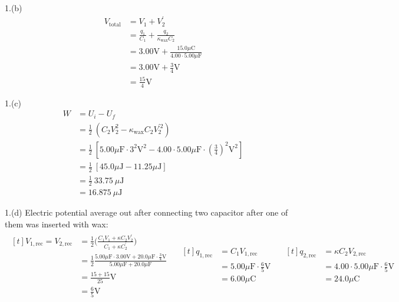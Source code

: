 \documentclass[11pt]{article}
\begin{document}
1.(b)
\begin{align*}
V_{\mathrm{total}} &= V_1 + V^{'}_2 \\
          &= \frac{q_1}{C_1} + \frac{q_2}{\kappa_{\mathrm{wax}} C_2} \\
          &= 3.00 \mathrm{V} + \frac{15.0 \mu \mathrm{C}}{4.00 \cdot 5.00 \mu \mathrm{F}} \\
          &= 3.00 \mathrm{V} + \frac{3}{4} \mathrm{V} \\
          &= \frac{15}{4} \mathrm{V}
\end{align*}

1.(c)
\begin{align*}
W &= U_i - U_f \\
  &= \frac{1}{2} \ ( C_2 V_2^2 - \kappa_{\mathrm{wax}} C_2 V_2^{'2} ) \\
  &= \frac{1}{2} \ [ 5.00 \mu \mathrm{F} \cdot 3^2 \mathrm{V}^2 - 4.00 \cdot 5.00 \mu \mathrm{F} \cdot (\tfrac{3}{4})^2 \mathrm{V}^{2} ] \\
  &= \frac{1}{2} \ [45.0 \mu \mathrm{J} - 11.25 \mu \mathrm{J}] \\
  &= \frac{1}{2} \ 33.75 \ \mu \mathrm{J} \\
  &= 16.875 \ \mu \mathrm{J}
\end{align*}

1.(d)
Electric potential average out after connecting two capacitor after one of them was inserted with wax:
\begin{align*}
\begin{aligned}[t]
V_{1, \mathrm{rec}} = V_{2, \mathrm{rec}} &= \frac{1}{2} \bigg( \frac{C_1 V_1 + \kappa C_2 V_2^{'}}{C_1 + \kappa C_2^{'}} \bigg) \\
  &= \frac{1}{2} \frac{5.00 \mu \mathrm{F} \cdot 3.00 \mathrm{V} + 20.0 \mu \mathrm{F} \cdot \tfrac{3}{4} \mathrm{V}}{5.00 \mu \mathrm{F} + 20.0 \mu \mathrm{F}} \\
  &= \frac{15 + 15}{25} \mathrm{V}\\
  &= \frac{6}{5} \mathrm{V}\\
\end{aligned}
\quad
\begin{aligned}[t]
q_{1, \mathrm{rec}} &= C_1 V_{1, \mathrm{rec}} \\
  &=  5.00 \mu \mathrm{F} \cdot \frac{6}{5} \mathrm{V} \\
  &=  6.00 \mu \mathrm{C} \\
\end{aligned}
\quad
\begin{aligned}[t]
q_{2, \mathrm{rec}} &= \kappa C_2 V_{2, \mathrm{rec}} \\
  &=  4.00 \cdot 5.00 \mu \mathrm{F} \cdot \frac{6}{5} \mathrm{V} \\
  &=  24.0 \mu \mathrm{C} \\
\end{aligned}
\end{align*}
\end{document}
